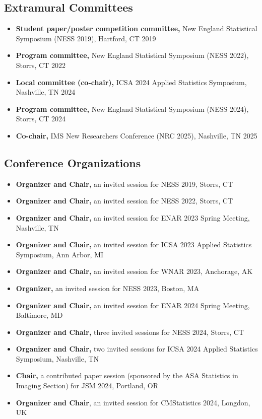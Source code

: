 \documentclass[12pt]{article}
\begin{document}
	\subsection*{Extramural Committees}
	\begin{itemize}
		\item {\bf Student paper/poster competition committee,} New 
		England Statistical Symposium (NESS 2019), Hartford, CT 
		\hfill 2019
		\item {\bf Program committee,} New England Statistical 
		Symposium (NESS 2022), Storrs, CT \hfill 2022
		\item {\bf Local committee (co-chair),} ICSA 2024 Applied 
		Statistics Symposium, Nashville, TN \hfill \mbox{2024}
		\item {\bf Program committee,} New England Statistical 
		Symposium (NESS 2024), Storrs, CT \hfill 2024
		\item {\bf Co-chair,} IMS New Researchers Conference (NRC 
		2025), Nashville, TN \hfill 2025
	\end{itemize}
	
	\subsection*{Conference Organizations}
	\begin{itemize}
		\item {\bf Organizer and Chair,} an invited session for NESS 
		2019, Storrs, CT
		\item {\bf Organizer and Chair,} an invited session for NESS 
		2022, Storrs, CT
		\item {\bf Organizer and Chair,} an invited session for ENAR 
		2023 Spring Meeting, Nashville, TN
		\item {\bf Organizer and Chair,} an invited session for ICSA 
		2023 Applied Statistics Symposium, Ann Arbor, MI
		\item {\bf Organizer and Chair,} an invited session for WNAR 
		2023, Anchorage, AK
		\item {\bf Organizer,} an invited session for NESS 2023, 
		Boston, MA
		\item {\bf Organizer and Chair,} an invited session for ENAR 
		2024 Spring Meeting, Baltimore, MD
		\item {\bf Organizer and Chair,} three invited sessions for 
		NESS 2024, Storrs, CT
		\item {\bf Organizer and Chair,} two invited sessions for 
		ICSA 2024 Applied Statistics Symposium, Nashville, TN
		\item {\bf Chair,} a contributed paper session (sponsored by 
		the ASA Statistics in Imaging Section) for JSM 2024, 
		Portland, OR
		\item {\bf Organizer and Chair}, an invited session for 
		CMStatistics 2024, Longdon, UK 
	\end{itemize}
	
\end{document}

